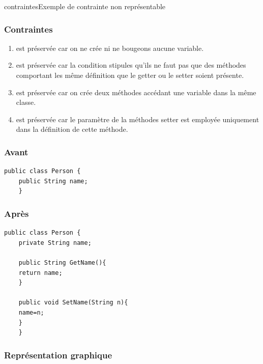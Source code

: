 \documentclass[a4paper, 12pt]{article}
\begin{document}
\begin{figu}{contraintes}{Exemple de contrainte non représentable}
  \subsubsection{Contraintes}

  \begin{enumerate}
    \item est préservée car on ne crée ni ne bougeons aucune variable.
    \item est préservée car la condition stipules qu'ils ne faut pas que des méthodes comportant les même définition que le getter ou le setter soient présente.
    \item est préservée car on crée deux méthodes accédant une variable dans la même classe.
    \item est préservée car le paramètre de la méthodes setter est employée uniquement dans la définition de cette méthode.
  \end{enumerate}

  \subsubsection{Avant}

  \begin{lstlisting}[frame=single]
    public class Person {
    public String name;
    }
  \end{lstlisting}

  \subsubsection{Après}

  \begin{lstlisting}[frame=single]
    public class Person {
    private String name;

    public String GetName(){
    return name;
    }

    public void SetName(String n){
    name=n;
    }
    }
  \end{lstlisting}

  \subsubsection{Représentation graphique}


\end{figu}
\end{document}
